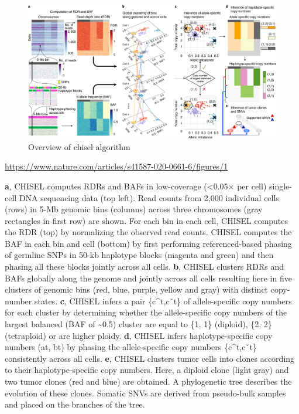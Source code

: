 \documentclass[
]{book}
\begin{document}
\begin{figure}
\centering
\includegraphics{./figs/CNV/chisel.jpg}
\caption{Overview of chisel algorithm}
\end{figure}

\url{https://www.nature.com/articles/s41587-020-0661-6/figures/1}

\textbf{a}, CHISEL computes RDRs and BAFs in low-coverage (\textless0.05× per cell) single-cell DNA sequencing data (top left). Read counts from 2,000 individual cells (rows) in 5-Mb genomic bins (columns) across three chromosomes (gray rectangles in first row) are shown.
For each bin in each cell, CHISEL computes the RDR (top) by normalizing the observed read counts. CHISEL computes the BAF in each bin and cell (bottom) by first performing referenced-based phasing of germline SNPs in 50-kb haplotype blocks (magenta and green) and then phasing all these blocks jointly across all cells.
\textbf{b}, CHISEL clusters RDRs and BAFs globally along the genome and jointly across all cells resulting here in five clusters of genomic bins (red, blue, purple, yellow and gray) with distinct copy-number states.
\textbf{c}, CHISEL infers a pair \{c\^{}t,cˇt\} of allele-specific copy numbers for each cluster by determining whether the allele-specific copy numbers of the largest balanced (BAF of \textasciitilde0.5) cluster are equal to \{1, 1\} (diploid), \{2, 2\} (tetraploid) or are higher ploidy.
\textbf{d}, CHISEL infers haplotype-specific copy numbers (at, bt) by phasing the allele-specific copy numbers \{c\^{}t,cˇt\} consistently across all cells.
\textbf{e}, CHISEL clusters tumor cells into clones according to their haplotype-specific copy numbers. Here, a diploid clone (light gray) and two tumor clones (red and blue) are obtained.
A phylogenetic tree describes the evolution of these clones. Somatic SNVs are derived from pseudo-bulk samples and placed on the branches of the tree.
\end{document}
